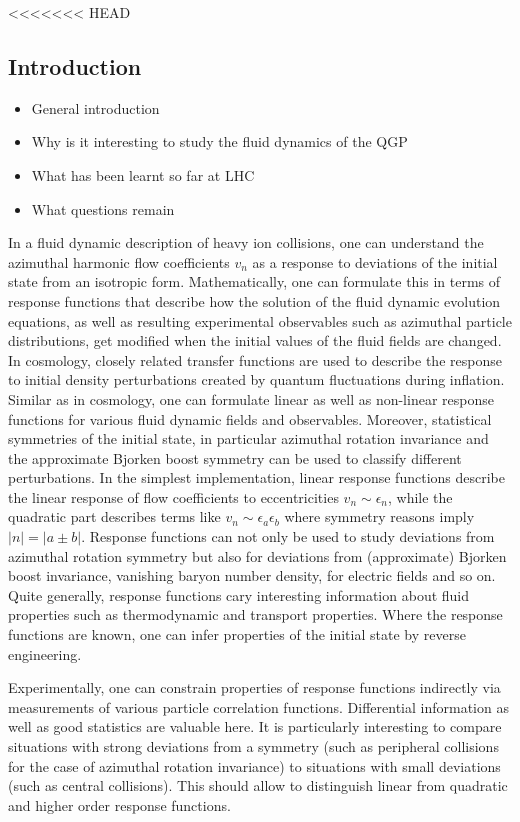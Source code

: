 <<<<<<< HEAD
\subsection{Introduction}
\begin{itemize}
	\item General introduction
	\item Why is it interesting to study the fluid dynamics of the QGP
	\item What has been learnt so far at LHC 
	\item What questions remain
\end{itemize}
In a fluid dynamic description of heavy ion collisions,  one can understand the azimuthal harmonic flow coefficients $v_n$ as a response to deviations of the initial state from an isotropic form. Mathematically,  one can formulate this in terms of response functions that describe how the solution of the fluid dynamic evolution equations,  as well as resulting experimental observables such as azimuthal particle distributions,  get modified when the initial values of the fluid fields are changed. In cosmology,  closely related transfer functions are used to describe the response to initial density perturbations created by quantum fluctuations during inflation. Similar as in cosmology,  one can formulate linear as well as non-linear response functions for various fluid dynamic fields and observables. Moreover,  statistical symmetries of the initial state,  in particular azimuthal rotation invariance and the approximate Bjorken boost symmetry can be used to classify different perturbations. In the simplest implementation,  linear response functions describe the linear response of flow coefficients to eccentricities $v_n \sim\epsilon_n$,  while the quadratic part describes terms like $v_n \sim \epsilon_a\epsilon_b$ where symmetry reasons imply $|n|=|a\pm b|$. Response functions can not only be used to study deviations from azimuthal rotation symmetry but also for deviations from (approximate) Bjorken boost invariance,  vanishing baryon number density,  for electric fields and so on. Quite generally,  response functions cary interesting information about fluid properties such as thermodynamic and transport properties. Where the response functions are known,  one can infer properties of the initial state by reverse engineering.

Experimentally,  one can constrain properties of response functions indirectly via measurements of various particle correlation functions. Differential information as well as good statistics are valuable here. It is particularly interesting to compare situations with strong deviations from a symmetry (such as peripheral collisions for the case of azimuthal rotation invariance) to situations with small deviations (such as central collisions). This should allow to distinguish linear from quadratic and higher order response functions.

